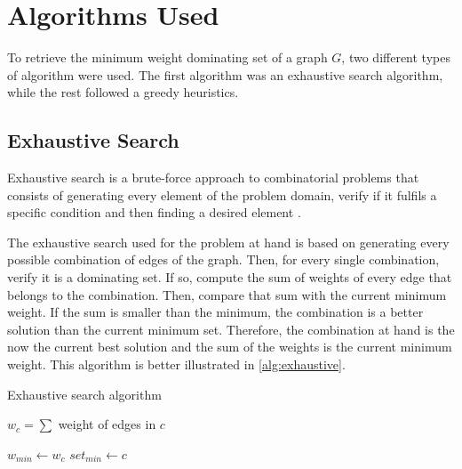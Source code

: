 \section{Algorithms Used}\label{section:algorithms-used}
To retrieve the minimum weight dominating set of a graph $G$, two different types of algorithm were used.
The first algorithm was an exhaustive search algorithm, while the rest followed a greedy heuristics.

\subsection{Exhaustive Search}\label{section:exhaustive-search}

Exhaustive search is a brute-force approach to combinatorial problems that consists of generating every element of the problem domain, verify if it fulfils a specific condition and then finding a desired element \cite{levitin2012introduction}.

The exhaustive search used for the problem at hand is based on generating every possible combination of edges of the graph.
Then, for every single combination, verify it is a dominating set.
If so, compute the sum of weights of every edge that belongs to the combination.
Then, compare that sum with the current minimum weight.
If the sum is smaller than the minimum, the combination is a better solution than the current minimum set.
Therefore, the combination at hand is the now the current best solution and the sum of the weights is the current minimum weight.
This algorithm is better illustrated in \autoref{alg:exhaustive}.

\begin{algorithm}
\caption{Exhaustive search algorithm}
\label{alg:exhaustive}
\begin{algorithmic}


        $w_c = \sum$ weight of edges in $c$
        

           \State $w_{min} \gets w_c$
           \State $set_{min} \gets c$

        \EndIf        
    \EndIf

\EndFor

\end{algorithmic}
\end{algorithm}

